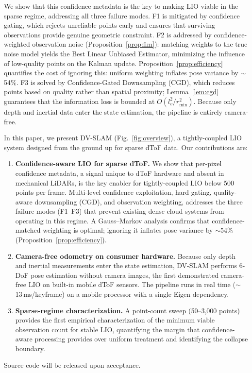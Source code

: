 \documentclass[journal]{IEEEtran}
\begin{document}
We show that this confidence metadata is the key to making LIO viable in the sparse regime, addressing all three failure modes.
F1 is mitigated by confidence gating, which rejects unreliable points early and ensures that surviving observations provide genuine geometric constraint.
F2 is addressed by confidence-weighted observation noise (Proposition~\ref{prop:fim}): matching weights to the true noise model yields the Best Linear Unbiased Estimator, minimizing the influence of low-quality points on the Kalman update. Proposition~\ref{prop:efficiency} quantifies the cost of ignoring this: uniform weighting inflates pose variance by ${\sim}$54\%.
F3 is solved by Confidence-Gated Downsampling (CGD), which reduces points based on quality rather than spatial proximity; Lemma~\ref{lem:cgd} guarantees that the information loss is bounded at $O(l_v^2 / r_{\min}^2)$.
Because only depth and inertial data enter the state estimation, the pipeline is entirely camera-free.

In this paper, we present DV-SLAM (Fig.~\ref{fig:overview}), a tightly-coupled LIO system designed from the ground up for sparse dToF data. Our contributions are:

\begin{enumerate}
    \item \textbf{Confidence-aware LIO for sparse dToF.} We show that per-pixel confidence metadata, a signal unique to dToF hardware and absent in mechanical LiDARs, is the key enabler for tightly-coupled LIO below 500 points per frame. Multi-level confidence exploitation, hard gating, quality-aware downsampling (CGD), and observation weighting, addresses the three failure modes (F1--F3) that prevent existing dense-cloud systems from operating in this regime. A Gauss--Markov analysis confirms that confidence-matched weighting is optimal; ignoring it inflates pose variance by ${\sim}$54\% (Proposition~\ref{prop:efficiency}).
    \item \textbf{Camera-free odometry on consumer hardware.} Because only depth and inertial measurements enter the state estimation, DV-SLAM performs 6-DoF pose estimation without camera images, the first demonstrated camera-free LIO on built-in mobile dToF sensors. The pipeline runs in real time (${\sim}$13\,ms/keyframe) on a mobile processor with a single Eigen dependency.
    \item \textbf{Sparse-regime characterization.} A point-count sweep (50--3{,}000 points) provides the first empirical characterization of the minimum viable observation count for stable LIO, quantifying the margin that confidence-aware processing provides over uniform treatment and identifying the collapse boundary.
\end{enumerate}
Source code will be released upon acceptance.
\end{document}
